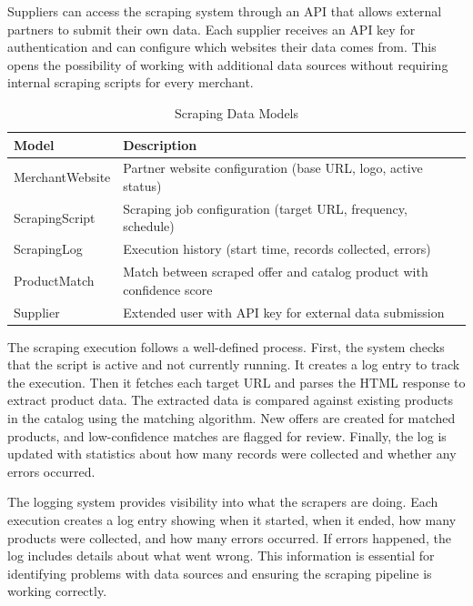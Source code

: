 Suppliers can access the scraping system through an API that
allows external partners to submit their own data. Each supplier
receives an API key for authentication and can configure which
websites their data comes from. This opens the possibility of
working with additional data sources without requiring internal
scraping scripts for every merchant.

\begin{table}[H]
\begin{center}
\begin{tabular}{|m{3.5cm}|m{5.5cm}|}
\hline
\textbf{Model} & \textbf{Description} \\ \hline
MerchantWebsite & Partner website configuration (base URL, logo, active status) \\ \hline
ScrapingScript & Scraping job configuration (target URL, frequency, schedule) \\ \hline
ScrapingLog & Execution history (start time, records collected, errors) \\ \hline
ProductMatch & Match between scraped offer and catalog product with confidence score \\ \hline
Supplier & Extended user with API key for external data submission \\ \hline
\end{tabular}
\caption{Scraping Data Models}
\label{tab:scraping_models}
\end{center}
\end{table}

The scraping execution follows a well-defined process. First,
the system checks that the script is active and not currently
running. It creates a log entry to track the execution. Then it
fetches each target URL and parses the HTML response to extract
product data. The extracted data is compared against existing
products in the catalog using the matching algorithm. New offers
are created for matched products, and low-confidence matches
are flagged for review. Finally, the log is updated with statistics
about how many records were collected and whether any errors
occurred.

The logging system provides visibility into what the scrapers
are doing. Each execution creates a log entry showing when it
started, when it ended, how many products were collected, and
how many errors occurred. If errors happened, the log includes
details about what went wrong. This information is essential
for identifying problems with data sources and ensuring the
scraping pipeline is working correctly.

